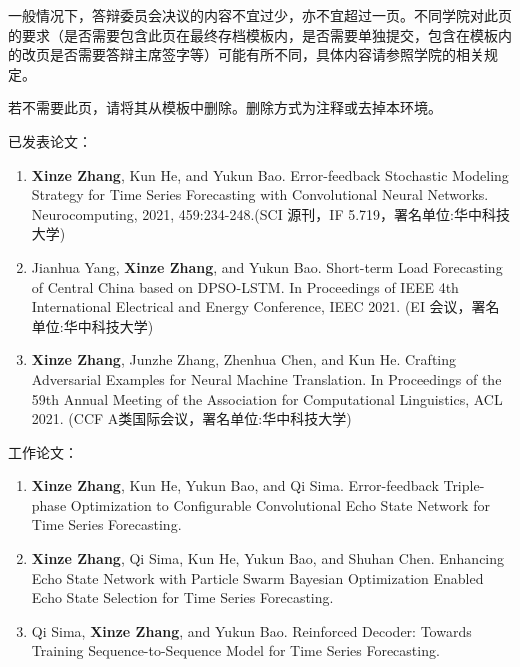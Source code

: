 
\begin{decision}
一般情况下，答辩委员会决议的内容不宜过少，亦不宜超过一页。不同学院对此页的要求（是否需要包含此页在最终存档模板内，是否需要单独提交，包含在模板内的改页是否需要答辩主席签字等）可能有所不同，具体内容请参照学院的相关规定。 

若不需要此页，请将其从模板中删除。删除方式为注释或去掉本环境。
\end{decision}



\begin{publications}
    已发表论文：
    \renewcommand{\labelenumi}{[\arabic{enumi}]}
    \begin{enumerate}
        \item {
            \textbf{Xinze Zhang}, Kun He, and Yukun Bao. Error-feedback Stochastic Modeling Strategy for Time Series Forecasting with Convolutional Neural Networks. Neurocomputing, 2021, 459:234-248.(SCI 源刊，IF 5.719，署名单位:华中科技大学)
              }
        \item {Jianhua Yang, \textbf{Xinze Zhang}, and Yukun Bao. Short-term Load Forecasting of Central China based on DPSO-LSTM. In Proceedings of IEEE 4th International Electrical and Energy Conference, IEEC 2021. (EI 会议，署名单位:华中科技大学)
              }
        \item {\textbf{Xinze Zhang}, Junzhe Zhang, Zhenhua Chen, and Kun He. Crafting Adversarial Examples for Neural Machine Translation. In Proceedings of the 59th Annual Meeting of the Association for Computational Linguistics, ACL 2021. (CCF A类国际会议，署名单位:华中科技大学)}
    \end{enumerate}

    \vspace{1em}
    工作论文：
    \begin{enumerate}
        \item {
            \textbf{Xinze Zhang}, Kun He, Yukun Bao, and Qi Sima. Error-feedback Triple-phase Optimization to Configurable Convolutional Echo State Network for Time Series Forecasting.
              }
        \item {
            \textbf{Xinze Zhang}, Qi Sima, Kun He, Yukun Bao, and Shuhan Chen. Enhancing Echo State Network with Particle Swarm Bayesian Optimization Enabled Echo State Selection for Time Series Forecasting.
              }
        \item {
             Qi Sima, \textbf{Xinze Zhang}, and Yukun Bao. Reinforced Decoder: Towards Training Sequence-to-Sequence Model for Time Series Forecasting.
              }
    \end{enumerate}

\end{publications}

